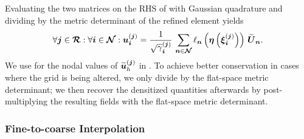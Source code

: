 Evaluating the two matrices on the RHS of 
with Gaussian quadrature
and dividing by the metric determinant of the refined element yields
\begin{equation}
  \forall\boldsymbol{j}\in\boldsymbol{\mathcal{R}}:\forall\boldsymbol{i}\in\boldsymbol{\mathcal{N}}:
  \boldsymbol{u}_{\boldsymbol{i}}^{\left(\boldsymbol{j}\right)}
  =\frac{1}{\sqrt{\gamma}_{\boldsymbol{i}}^{\left(\boldsymbol{j}\right)}}\,
  \sum\limits_{\boldsymbol{n}\in\boldsymbol{\mathcal{N}}}
  \ell_{\boldsymbol{n}}\left(\boldsymbol{\eta}\left(\boldsymbol{\xi}_{\boldsymbol{i}}^{\left(\boldsymbol{j}\right)}\right)\right)\,
  \widetilde{\boldsymbol{U}}_{\boldsymbol{n}}.
  \label{eq.refNodal}
\end{equation}
We use  for the nodal values of
$\widetilde{\boldsymbol{u}}^{\left(\boldsymbol{j}\right)}_{h}$ in .
To achieve better conservation in cases where the grid is being altered,
we only divide  by the flat-space metric determinant;
we then recover the densitized quantities afterwards by post-multiplying
the resulting fields with the flat-space metric determinant.

\subsubsection{Fine-to-coarse Interpolation}

